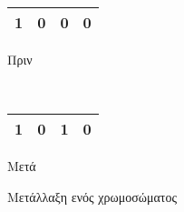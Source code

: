 \begin{figure}[!t]
    \centering
    \begin{subtable}[b]{.4\linewidth}
        \centering
        \begin{tabular}{|c|c|c|c|}
            \hline
            1 & 0 & \cellcolor{gray!25}0 & 0\\
            \hline
        \end{tabular}
        \caption{Πριν}
        \label{fig_beforeMutation}
    \end{subtable}
    ~
    \begin{subtable}[b]{.3\linewidth}
        \centering
        \begin{tabular}{|c|c|c|c|}
            \hline
            1 & 0 & \cellcolor{gray!25}1 & 0\\
            \hline
        \end{tabular}
        \caption{Μετά}
        \label{fig_afterMutation}
    \end{subtable}
    \caption{Μετάλλαξη ενός χρωμοσώματος}
    \label{fig_mutation}
\end{figure} 